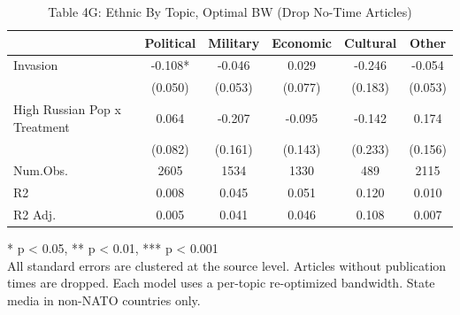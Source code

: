 \begin{table}[!t]
\caption{Table 4G: Ethnic By Topic, Optimal BW (Drop No-Time Articles)} 
\fontsize{12.0pt}{14.4pt}\selectfont
\begin{tabular*}{\linewidth}{@{\extracolsep{\fill}}lccccc}
\toprule
  & Political & Military & Economic & Cultural & Other \\ 
\midrule\addlinespace[2.5pt]
Invasion & -0.108* & -0.046 & 0.029 & -0.246 & -0.054 \\ 
 & (0.050) & (0.053) & (0.077) & (0.183) & (0.053) \\ 
High Russian Pop x Treatment & 0.064 & -0.207 & -0.095 & -0.142 & 0.174 \\ 
{} & {(0.082)} & {(0.161)} & {(0.143)} & {(0.233)} & {(0.156)} \\ 
Num.Obs. & 2605 & 1534 & 1330 & 489 & 2115 \\ 
R2 & 0.008 & 0.045 & 0.051 & 0.120 & 0.010 \\ 
R2 Adj. & 0.005 & 0.041 & 0.046 & 0.108 & 0.007 \\ 
\bottomrule
\end{tabular*}
\begin{minipage}{\linewidth}
* p < 0.05, ** p < 0.01, *** p < 0.001\\
All standard errors are clustered at the source level. Articles without
publication times are dropped. Each model uses a per-topic re-optimized
bandwidth. State media in non-NATO countries only.\\
\end{minipage}
\end{table}


